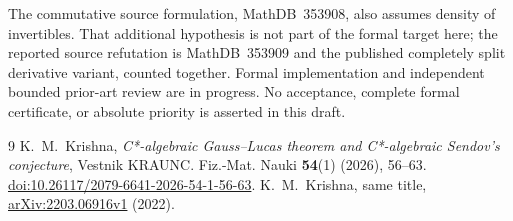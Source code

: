 \documentclass[11pt]{article}
\begin{document}
The commutative source formulation, MathDB~353908, also assumes density of
invertibles. That additional hypothesis is not part of the formal target
here; the reported source refutation is MathDB~353909 and the published
completely split derivative variant, counted together. Formal implementation
and independent bounded prior-art review are in progress. No acceptance,
complete formal certificate, or absolute priority is asserted in this draft.

\begin{thebibliography}{9}
 K.~M.~Krishna,
\emph{C*-algebraic Gauss--Lucas theorem and C*-algebraic Sendov's conjecture},
Vestnik KRAUNC. Fiz.-Mat. Nauki \textbf{54}(1) (2026), 56--63.
\href{https://doi.org/10.26117/2079-6641-2026-54-1-56-63}{doi:10.26117/2079-6641-2026-54-1-56-63}.
 K.~M.~Krishna, same title,
\href{https://arxiv.org/abs/2203.06916v1}{arXiv:2203.06916v1} (2022).
\end{thebibliography}
\end{document}
